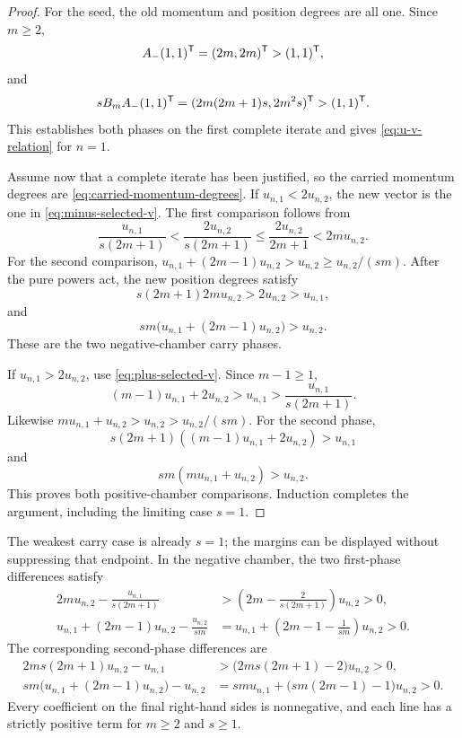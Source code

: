 \documentclass[11pt]{article}
\theoremstyle{definition}
\theoremstyle{remark}
\begin{document}
\begin{proof}
For the seed, the old momentum and position degrees are all one.  Since
\(m\geq2\),
\[
A_{-}(1,1)^{\mathsf{T}}=(2m,2m)^{\mathsf{T}}>(1,1)^{\mathsf{T}},
\]
and
\[
sB_mA_{-}(1,1)^{\mathsf{T}}
=(2m(2m+1)s,2m^2s)^{\mathsf{T}}>(1,1)^{\mathsf{T}}.
\]
This establishes both phases on the first complete iterate and gives
\eqref{eq:u-v-relation} for \(n=1\).

Assume now that a complete iterate has been justified, so the carried
momentum degrees are \eqref{eq:carried-momentum-degrees}.  If
\(u_{n,1}<2u_{n,2}\), the new vector is the one in
\eqref{eq:minus-selected-v}.  The first comparison follows from
\[
\frac{u_{n,1}}{s(2m+1)}
<\frac{2u_{n,2}}{s(2m+1)}\leq\frac{2u_{n,2}}{2m+1}<2mu_{n,2}.
\]
For the second comparison,
\(u_{n,1}+(2m-1)u_{n,2}>u_{n,2}\geq u_{n,2}/(sm)\).
After the pure powers act, the new position degrees satisfy
\[
s(2m+1)2mu_{n,2}>2u_{n,2}>u_{n,1},
\]
and
\[
sm\bigl(u_{n,1}+(2m-1)u_{n,2}\bigr)>u_{n,2}.
\]
These are the two negative-chamber carry phases.

If \(u_{n,1}>2u_{n,2}\), use \eqref{eq:plus-selected-v}.  Since
\(m-1\geq1\),
\[
(m-1)u_{n,1}+2u_{n,2}>u_{n,1}
>\frac{u_{n,1}}{s(2m+1)}.
\]
Likewise \(mu_{n,1}+u_{n,2}>u_{n,2}>u_{n,2}/(sm)\).  For the second
phase,
\[
s(2m+1)((m-1)u_{n,1}+2u_{n,2})>u_{n,1}
\]
and
\[
sm(mu_{n,1}+u_{n,2})>u_{n,2}.
\]
This proves both positive-chamber comparisons.  Induction completes the
argument, including the limiting case \(s=1\).
\end{proof}

The weakest carry case is already \(s=1\); the margins can be displayed
without suppressing that endpoint.  In the negative chamber, the two
first-phase differences satisfy
\begin{align*}
2mu_{n,2}-\frac{u_{n,1}}{s(2m+1)}
&>\left(2m-\frac{2}{s(2m+1)}\right)u_{n,2}>0,\\
u_{n,1}+(2m-1)u_{n,2}-\frac{u_{n,2}}{sm}
&=u_{n,1}+\left(2m-1-\frac1{sm}\right)u_{n,2}>0.
\end{align*}
The corresponding second-phase differences are
\begin{align*}
2ms(2m+1)u_{n,2}-u_{n,1}
&>\bigl(2ms(2m+1)-2\bigr)u_{n,2}>0,\\
sm\bigl(u_{n,1}+(2m-1)u_{n,2}\bigr)-u_{n,2}
&=smu_{n,1}+\bigl(sm(2m-1)-1\bigr)u_{n,2}>0.
\end{align*}
Every coefficient on the final right-hand sides is nonnegative, and each
line has a strictly positive term for \(m\geq2\) and \(s\geq1\).
\end{document}

